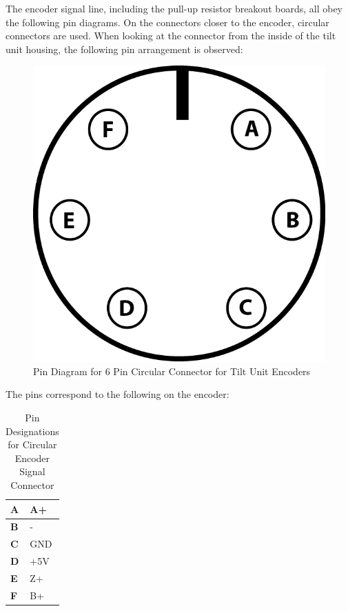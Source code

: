 The encoder signal line, including the pull-up resistor breakout boards, all obey the following pin diagrams. On the connectors closer to the encoder, circular connectors are used. When looking at the connector from the inside of the tilt unit housing, the following pin arrangement is observed:

\begin{figure}[H]
\centering
\includegraphics[scale=.3]{Photos/Encoder_6PinCircularPinDiagram.jpg}
\caption{\label{fig:6pincircular} Pin Diagram for 6 Pin Circular Connector for Tilt Unit Encoders}
\end{figure}

\noindent The pins correspond to the following on the encoder:

\begin{table}[H]
\centering
\caption{Pin Designations for Circular Encoder Signal Connector}
\label{pintable}
\begin{tabular}{|l|l|}
\hline
\textbf{A} & A+  \\ \hline
\textbf{B} & -   \\ \hline
\textbf{C} & GND \\ \hline
\textbf{D} & +5V \\ \hline
\textbf{E} & Z+  \\ \hline
\textbf{F} & B+  \\ \hline
\end{tabular}
\end{table}

